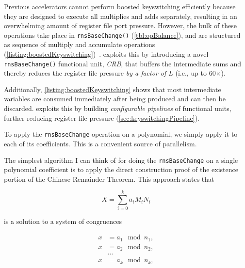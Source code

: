 Previous accelerators cannot perform boosted keyswitching efficiently because
they are designed to execute all multiplies and adds separately, resulting in an
overwhelming amount of register file port pressure.
However, the bulk of these \mbox{operations} take place in \verb!rnsBaseChange()!
(\autoref{tbl:opBalance}), and are structured as sequence of multiply and accumulate
operations (\autoref{listing:boostedKeyswitching})~\cite{bajard:2016:full}.
\name exploits this by introducing a novel \verb!rnsBaseChange()! functional
unit, \emph{CRB}, that buffers the intermediate sums and thereby reduces the
register file pressure \emph{by a factor of $L$} (i.e., up to 60$\times$).

Additionally, \autoref{listing:boostedKeyswitching} shows that most intermediate
variables are consumed immediately after being produced and can then be discarded.
\name exploits this by building \emph{configurable pipelines} of functional units,
further reducing register file pressure (\autoref{sec:keyswitchingPipeline}).




 

To apply the \verb!rnsBaseChange! operation on a polynomial, we simply apply it to
each of its coefficients. This is a convenient source of parallelism.

The simplest algorithm I can think of for doing the \verb!rnsBaseChange! on a
single polynomial coefficient is to apply the direct construction proof of the
existence portion of the Chinese Remainder Theorem\cite{gauss1966english}.
This approach states that

\begin{equation*}
X = \sum_{i=0}^k a_i M_i N_i
\end{equation*}

is a solution to a system of congruences

\begin{align*}
    x &= a_1 \mod n_1, \\
    x &= a_2 \mod n_2, \\
      &... \\
    x &= a_k \mod n_k,
\end{align*}

